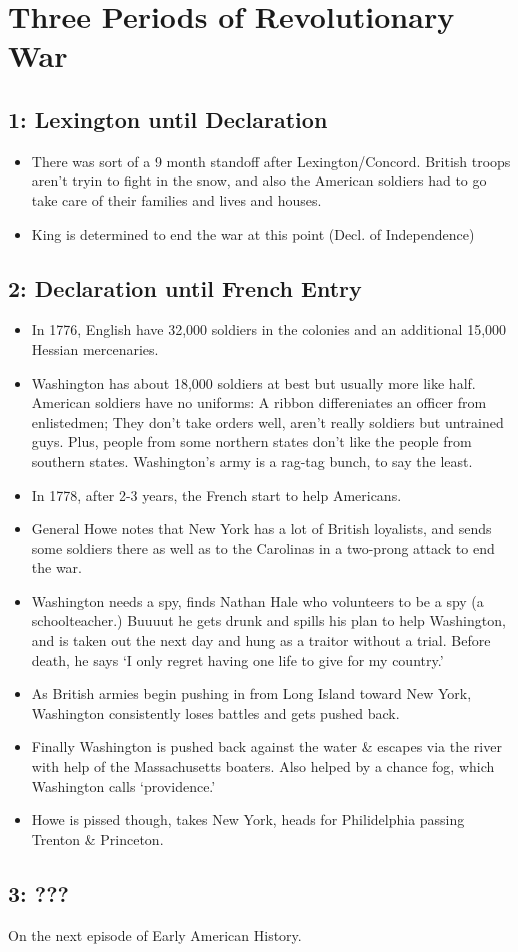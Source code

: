 \documentclass{article}
\begin{document}
  \section{Three Periods of Revolutionary War}
    \subsection{1: Lexington until Declaration} 
      \begin{itemize}
        \item There was sort of a 9 month standoff after Lexington/Concord. British troops aren't tryin to fight in the snow, and also the American soldiers had to go take care of their families and lives and houses.
        \item King is determined to end the war at this point (Decl. of Independence)
      \end{itemize}
        
    \subsection{2: Declaration until French Entry} 
      \begin{itemize}
        \item In 1776, English have 32,000 soldiers in the colonies and an additional 15,000 Hessian mercenaries.
        \item Washington has about 18,000 soldiers at best but usually more like half. American soldiers have no uniforms: A ribbon differeniates an officer from enlistedmen; They don't take orders well, aren't really soldiers but untrained guys. Plus, people from some northern states don't like the people from southern states. Washington's army is a rag-tag bunch, to say the least.
        \item In 1778, after 2-3 years, the French start to help Americans.
        \item General Howe notes that New York has a lot of British loyalists, and sends some soldiers there as well as to the Carolinas in a two-prong attack to end the war.
        \item Washington needs a spy, finds Nathan Hale who volunteers to be a spy (a schoolteacher.) Buuuut he gets drunk and spills his plan to help Washington, and is taken out the next day and hung as a traitor without a trial. Before death, he says `I only regret having one life to give for my country.'
        \item As British armies begin pushing in from Long Island toward New York, Washington consistently loses battles and gets pushed back.
        \item Finally Washington is pushed back against the water \& escapes via the river with help of the Massachusetts boaters. Also helped by a chance fog, which Washington calls `providence.'
        \item Howe is pissed though, takes New York, heads for Philidelphia passing Trenton \& Princeton.
      \end{itemize}
     
    \subsection{3: ???} On the next episode of Early American History.
\end{document}
